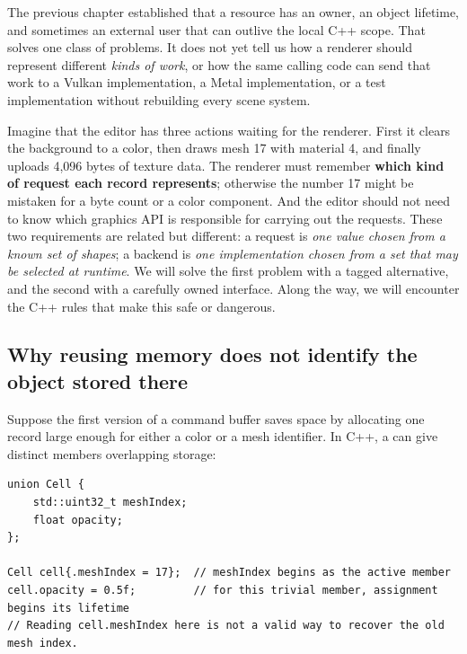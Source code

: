 \hypertarget{01-foundations-i-ch004-from-one-owned-resource-to-many-requests-and-a-replaceable-backend}{}

The previous chapter established that a resource has an owner, an object lifetime, and sometimes an external user that can outlive the local C++ scope. That solves one class of problems. It does not yet tell us how a renderer should represent different \emph{kinds of work}, or how the same calling code can send that work to a Vulkan implementation, a Metal implementation, or a test implementation without rebuilding every scene system.

Imagine that the editor has three actions waiting for the renderer. First it clears the background to a color, then draws mesh 17 with material 4, and finally uploads 4,096 bytes of texture data. The renderer must remember \textbf{which kind of request each record represents}; otherwise the number 17 might be mistaken for a byte count or a color component. And the editor should not need to know which graphics API is responsible for carrying out the requests. These two requirements are related but different: a request is \emph{one value chosen from a known set of shapes}; a backend is \emph{one implementation chosen from a set that may be selected at runtime}. We will solve the first problem with a tagged alternative, and the second with a carefully owned interface. Along the way, we will encounter the C++ rules that make this safe or dangerous.

\subsection{Why reusing memory does not identify the object stored there}\label{01-foundations-i-ch004-why-reusing-memory-does-not-identify-the-object-stored-there}

\hypertarget{01-foundations-i-ch004-why-reusing-memory-does-not-identify-the-object-stored-there}{}

Suppose the first version of a command buffer saves space by allocating one record large enough for either a color or a mesh identifier. In C++, a  can give distinct members overlapping storage:

\begin{verbatim}
union Cell {
    std::uint32_t meshIndex;
    float opacity;
};

Cell cell{.meshIndex = 17};  // meshIndex begins as the active member
cell.opacity = 0.5f;         // for this trivial member, assignment begins its lifetime
// Reading cell.meshIndex here is not a valid way to recover the old mesh index.
\end{verbatim}

